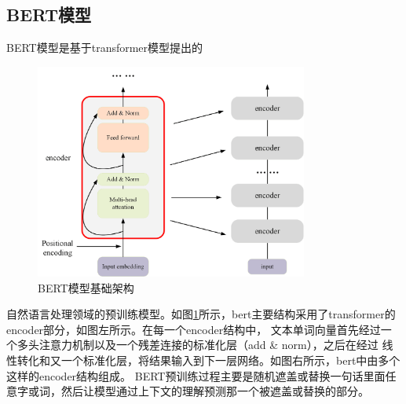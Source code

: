 \subsection{BERT模型}
BERT模型是基于transformer模型提出的
\begin{figure}[htb]%
	\setlength{\belowcaptionskip}{0pt}
	\centering
	\includegraphics[width=0.8\textwidth]{pic/2-15.png}
	\caption{BERT模型基础架构}
	\label{bert}
\end{figure}
自然语言处理领域的预训练模型。如图\ref{bert}所示，bert主要结构采用了transformer的encoder部分，如图左所示。在每一个encoder结构中，
文本单词向量首先经过一个多头注意力机制以及一个残差连接的标准化层（add \& norm），之后在经过
线性转化和又一个标准化层，将结果输入到下一层网络。如图右所示，bert中由多个这样的encoder结构组成。
BERT预训练过程主要是随机遮盖或替换一句话里面任意字或词，然后让模型通过上下文的理解预测那一个被遮盖或替换的部分。
